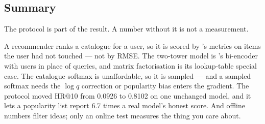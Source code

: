 \documentclass[11pt,a4paper]{article}
\begin{document}
\subsection{Summary}

\begin{keybox}[title={One line to keep}]
The protocol is part of the result. A number without it is not a measurement.
\end{keybox}

A recommender ranks a catalogue for a user, so it is scored by 's
metrics on items the user had not touched --- not by RMSE. The two-tower model
is 's bi-encoder with users in place of queries, and matrix
factorisation is its lookup-table special case. The catalogue softmax is
unaffordable, so it is sampled --- and a sampled softmax needs the $\log q$
correction or popularity bias enters the gradient. The protocol moved HR@10
from 0.0926 to 0.8102 on one unchanged model, and it lets a popularity list
report 6.7 times a real model's honest score. And offline numbers filter ideas;
only an online test measures the thing you care about.
\end{document}
